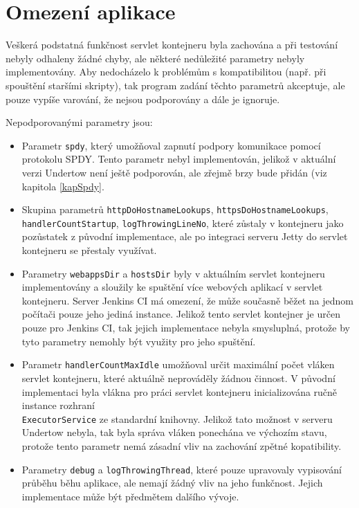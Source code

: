         
    \section{Omezení aplikace}
        Veškerá podstatná funkčnost servlet kontejneru byla zachována a při testování nebyly odhaleny žádné chyby,
        ale některé nedůležité parametry nebyly implementovány. Aby nedocházelo
        k problémům s kompatibilitou (např. při spouštění staršími skripty), tak program zadání těchto
        parametrů akceptuje, ale pouze vypíše varování, že nejsou podporovány a dále je ignoruje.
        
        \medskip
        \noindent Nepodporovanými parametry jsou:
        \begin{itemize}
            \item Parametr \texttt{spdy}, který umožňoval zapnutí podpory komunikace pomocí protokolu SPDY. Tento parametr
                nebyl implementován, jelikož v aktuální verzi Undertow není ještě podporován, ale zřejmě
                brzy bude přidán (viz kapitola \ref{kapSpdy}.

            \item Skupina parametrů \texttt{httpDoHostnameLookups}, \texttt{httpsDoHostnameLookups}, \\\texttt{handlerCountStartup},
                \texttt{logThrowingLineNo}, které zůstaly v kontejneru jako pozůstatek z původní implementace, ale po integraci
                serveru Jetty do servlet kontejneru se přestaly využívat.

            \item Parametry \texttt{webappsDir} a \texttt{hostsDir} byly v aktuálním servlet kontejneru implementovány
                a sloužily ke spuštění více webových aplikací v servlet kontejneru. Server Jenkins CI má omezení,
                že může současně běžet na jednom počítači pouze jeho jediná instance. 
                Jelikož tento servlet kontejner je určen pouze pro Jenkins CI, tak jejich implementace nebyla smysluplná,
                protože by tyto parametry nemohly být využity pro jeho spuštění.

            \item Parametr \texttt{handlerCountMaxIdle} umožňoval určit maximální počet vláken servlet kontejneru, 
                které aktuálně neprováděly žádnou činnost. V původní implementaci byla vlákna pro práci servlet kontejneru
                inicializována ručně instance rozhraní \\\texttt{ExecutorService} ze standardní knihovny. Jelikož
                tato možnost v serveru Undertow nebyla, tak byla správa vláken ponechána ve výchozím stavu,
                protože tento parametr nemá zásadní vliv na zachování zpětné kopatibility.

            \item Parametry \texttt{debug} a \texttt{logThrowingThread}, které pouze upravovaly vypisování průběhu
                běhu aplikace, ale nemají žádný vliv na jeho funkčnost. Jejich implementace může být předmětem dalšího
                vývoje.
        \end{itemize}
        
